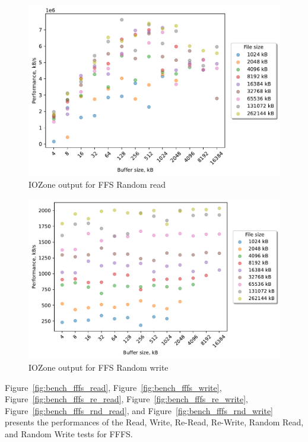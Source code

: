 \begin{figure}[!htb]
	\label{fig:bench_ffs_rnd_read}
	\begin{center}
		\includegraphics[width=1.0\textwidth]{figures/benchmarking/ffs/Random read.pdf}
	\end{center}
	\caption{IOZone output for FFS Random read}
\end{figure}

\begin{figure}[!htb]
	\label{fig:bench_ffs_rnd_write}
	\begin{center}
		\includegraphics[width=1.0\textwidth]{figures/benchmarking/ffs/Random write.pdf}
	\end{center}
	\caption{IOZone output for FFS Random write}
\end{figure}

\FloatBarrier

Figure~\ref{fig:bench_fffs_read}, Figure~\ref{fig:bench_fffs_write}, Figure~\ref{fig:bench_fffs_re_read}, Figure~\ref{fig:bench_fffs_re_write}, Figure~\ref{fig:bench_fffs_rnd_read}, and Figure~\ref{fig:bench_fffs_rnd_write} presents the performances of the Read, Write, \mbox{Re-Read}, \mbox{Re-Write}, Random Read, and Random Write tests for \gls{FFFS}.

